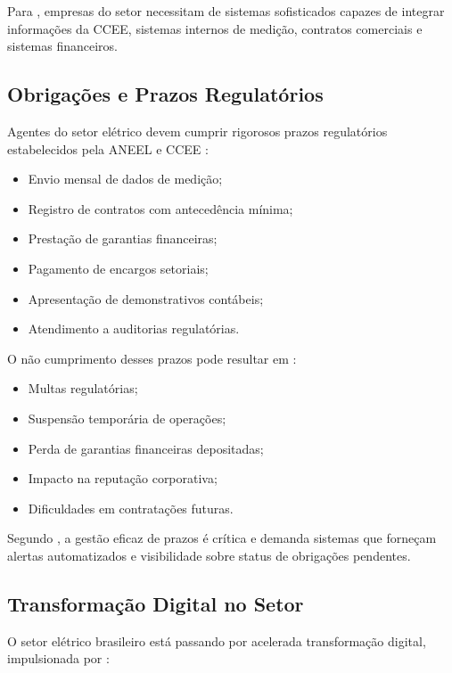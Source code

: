 Para \cite{castro2015}, empresas do setor necessitam de sistemas sofisticados capazes de integrar informações da CCEE, sistemas internos de medição, contratos comerciais e sistemas financeiros.

\subsection{Obrigações e Prazos Regulatórios}

Agentes do setor elétrico devem cumprir rigorosos prazos regulatórios estabelecidos pela ANEEL e CCEE \cite{aneel2022}:

\begin{itemize}
    \item Envio mensal de dados de medição;
    \item Registro de contratos com antecedência mínima;
    \item Prestação de garantias financeiras;
    \item Pagamento de encargos setoriais;
    \item Apresentação de demonstrativos contábeis;
    \item Atendimento a auditorias regulatórias.
\end{itemize}

O não cumprimento desses prazos pode resultar em \cite{ccee2023}:

\begin{itemize}
    \item Multas regulatórias;
    \item Suspensão temporária de operações;
    \item Perda de garantias financeiras depositadas;
    \item Impacto na reputação corporativa;
    \item Dificuldades em contratações futuras.
\end{itemize}

Segundo \cite{brito2018}, a gestão eficaz de prazos é crítica e demanda sistemas que forneçam alertas automatizados e visibilidade sobre status de obrigações pendentes.

\subsection{Transformação Digital no Setor}
O setor elétrico brasileiro está passando por acelerada transformação digital, impulsionada por \cite{epe2020}:

